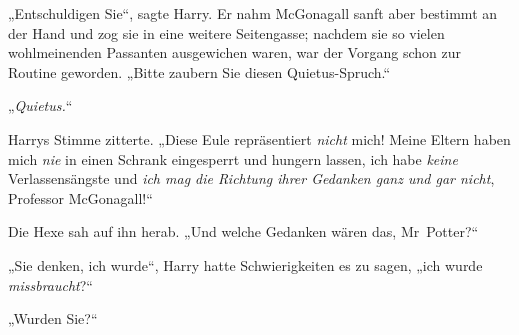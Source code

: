„Entschuldigen Sie“, sagte Harry. Er nahm McGonagall sanft aber bestimmt an der Hand und zog sie in eine weitere Seitengasse; nachdem sie so vielen wohlmeinenden Passanten ausgewichen waren, war der Vorgang schon zur Routine geworden. „Bitte zaubern Sie diesen Quietus-Spruch.“

„\emph{Quietus.}“

Harrys Stimme zitterte. „Diese Eule repräsentiert \emph{nicht} mich! Meine Eltern haben mich \emph{nie} in einen Schrank eingesperrt und hungern lassen, ich habe \emph{keine} Verlassensängste und \emph{ich mag die Richtung ihrer Gedanken ganz und gar nicht}, Professor McGonagall!“

Die Hexe sah auf ihn herab. „Und welche Gedanken wären das, Mr~Potter?“

„Sie denken, ich wurde“, Harry hatte Schwierigkeiten es zu sagen, „ich wurde \emph{missbraucht}?“

„Wurden Sie?“

